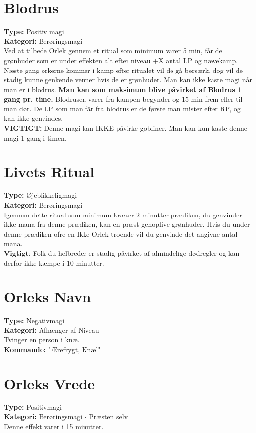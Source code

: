 \section*{Blodrus}
\textbf{Type:} Positiv magi\\
\textbf{Kategori:} Berøringsmagi\\
Ved at tilbede Orlek gennem et ritual som minimum varer 5 min, får de grønhuder som er under effekten alt efter niveau +X antal LP og nævekamp. Næste gang orkerne kommer i kamp efter ritualet vil de gå bersærk, dog vil de stadig kunne genkende venner hvis de er grønhuder. Man kan ikke kaste magi når man er i blodrus. \textbf{Man kan som maksimum blive påvirket af Blodrus 1 gang pr. time.}
Blodrusen varer fra kampen begynder og 15 min frem eller til man dør. De LP som man får fra
blodrus er de første man mister efter RP, og kan ikke genvindes.\\
\textbf{VIGTIGT:} Denne magi kan IKKE påvirke gobliner. Man kan kun kaste denne magi 1 gang i timen.\\

\section*{Livets Ritual}
\textbf{Type:} Øjeblikkeligmagi\\ 
\textbf{Kategori:} Berøringsmagi\\
Igennem dette ritual som minimum kræver 2 minutter prædiken, du genvinder ikke mana fra denne prædiken, kan en præst genoplive grønhuder. Hvis du under denne prædiken ofre en Ikke-Orlek troende vil du genvinde det angivne antal mana.\\
\textbf{Vigtigt:} Folk du helbreder er stadig påvirket af almindelige dødregler og kan derfor ikke kæmpe i 10 minutter.

\section*{Orleks Navn}
\textbf{Type:} Negativmagi\\ 
\textbf{Kategori:} Afhænger af Niveau\\
Tvinger en person i knæ.\\
\textbf{Kommando:} "Ærefrygt, Knæl"

\section*{Orleks Vrede}
\textbf{Type:} Positivmagi\\
\textbf{Kategori:} Berøringsmagi - Præsten selv\\
Denne effekt varer i 15 minutter.\\

